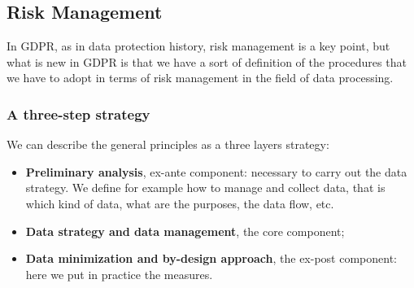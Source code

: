 \subsection{Risk Management}
In GDPR, as in data protection history, risk management is a key point, but what is new in GDPR is that we have a sort of definition of the procedures that we have to adopt in terms of risk management in the field of data processing.
\subsubsection{A three-step strategy}
We can describe the general principles as a three layers strategy:
\begin{itemize}
    \item \textbf{Preliminary analysis}, ex-ante component: necessary to carry out the data strategy. We define for example how to manage and collect data, that is which kind of data, what are the purposes, the data flow, etc.
    \item \textbf{Data strategy and data management}, the core component;
    \item \textbf{Data minimization and by-design approach}, the ex-post component: here we put in practice the measures.
\end{itemize}
